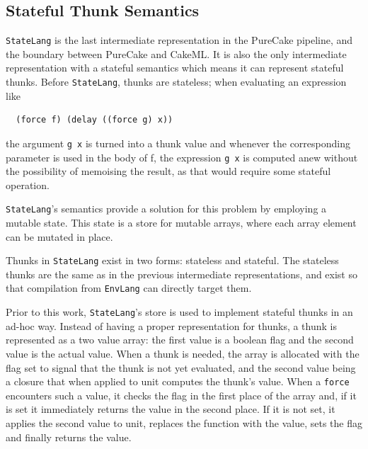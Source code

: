 \documentclass[sigconf]{acmart}
\newcommand{\code}[1]{\texttt{#1}}
\newcommand{\EnvLang}{\code{EnvLang}}
\newcommand{\StateLang}{\code{StateLang}}
\begin{document}
\subsection{Stateful Thunk Semantics}

\StateLang{} is the last intermediate representation in the PureCake pipeline,
and the boundary between PureCake and CakeML. It is also the only intermediate
representation with a stateful semantics which means it can represent stateful
thunks. Before \StateLang{}, thunks are stateless; when evaluating an expression
like
\begin{verbatim}
  (force f) (delay ((force g) x))
\end{verbatim}
the argument \code{g x} is turned into a thunk value and whenever the
corresponding parameter is used in the body of f, the expression \code{g x} is
computed anew without the possibility of memoising the result, as that would
require some stateful operation.

\StateLang{}'s semantics provide a solution for this problem by employing a
mutable state. This state is a store for mutable arrays, where each array
element can be mutated in place.

Thunks in \StateLang{} exist in two forms: stateless and stateful. The stateless
thunks are the same as in the previous intermediate representations, and exist
so that compilation from \EnvLang{} can directly target them.

Prior to this work, \StateLang{}'s store is used to implement stateful thunks in
an ad-hoc way. Instead of having a proper representation for thunks, a thunk is
represented as a two value array: the first value is a boolean flag and the
second value is the actual value. When a thunk is needed, the array is allocated
with the flag set to signal that the thunk is not yet evaluated, and the second
value being a closure that when applied to unit computes the thunk's value. When
a \code{force} encounters such a value, it checks the flag in the first place of
the array and, if it is set it immediately returns the value in the second
place. If it is not set, it applies the second value to unit, replaces the
function with the value, sets the flag and finally returns the value.
\end{document}
